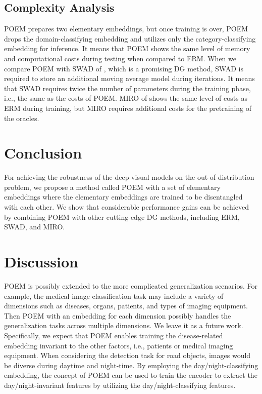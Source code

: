 \documentclass[letterpaper]{article} \usepackage{aaai23}  \usepackage{times}  \usepackage{helvet}  \usepackage{courier}  \usepackage[hyphens]{url}  \usepackage{graphicx} \urlstyle{rm} \def\UrlFont{\rm}  \usepackage{natbib}  \usepackage{caption} \frenchspacing  \setlength{\pdfpagewidth}{8.5in}  \setlength{\pdfpageheight}{11in}  \usepackage[labelsep=period]{caption}
\begin{document}
\subsection{Complexity Analysis}
POEM prepares two elementary embeddings, but once training is over, POEM drops the domain-classifying embedding and utilizes only the category-classifying embedding for inference. It means that POEM shows the same level of memory and computational costs during testing when compared to ERM.
When we compare POEM with SWAD of \cite{SWAD}, which is a promising DG method, SWAD is required to store an additional moving average model during iterations.
It means that SWAD requires twice the number of parameters during the training phase, i.e., the same as the costs of POEM. 
MIRO of \cite{MIRO} shows the same level of costs as ERM during training, but MIRO requires additional costs for the pretraining of the oracles.


\section{Conclusion}
For achieving the robustness of the deep visual models on the out-of-distribution problem, we propose a method called POEM with a set of elementary embeddings where the elementary embeddings are trained to be disentangled with each other. 
We show that considerable performance gains can be achieved by combining POEM with other cutting-edge DG methods, including ERM, SWAD, and MIRO. 




\section{Discussion}
POEM is possibly extended to the more complicated generalization scenarios.
For example, the medical image classification task may include a variety of dimensions such as diseases, organs, patients, and types of imaging equipment. 
Then POEM with an embedding for each dimension possibly handles the generalization tasks across multiple dimensions. We leave it as a future work.
Specifically, we expect that POEM enables training the disease-related embedding invariant to the other factors, i.e., patients or medical imaging equipment. 
When considering the detection task for road objects, images would be diverse during daytime and night-time. 
By employing the day/night-classifying embedding, the concept of POEM can be used to train the encoder to extract the day/night-invariant features by utilizing the day/night-classifying features.
\end{document}
